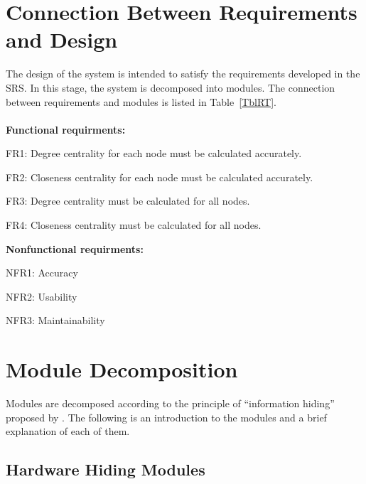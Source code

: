 \documentclass[12pt, titlepage]{article}
\begin{document}
\section{Connection Between Requirements and Design} \label{SecConnection}

The design of the system is intended to satisfy the requirements developed in
the SRS. In this stage, the system is decomposed into modules. The connection
between requirements and modules is listed in Table~\ref{TblRT}.\\\\
\textbf{Functional requirments:}
\begin{description}
\item FR1: Degree centrality for each node must be calculated accurately.
\item FR2: Closeness centrality for each node must be calculated accurately.
\item FR3: Degree centrality must be calculated for all nodes.
\item FR4: Closeness centrality must be calculated for all nodes.\\
\end{description}

\textbf{Nonfunctional requirments:}
\begin{description}
\item NFR1: Accuracy
\item NFR2: Usability
\item NFR3: Maintainability
\end{description}


\section{Module Decomposition} \label{SecMD}

Modules are decomposed according to the principle of ``information hiding''
proposed by \citet{ParnasEtAl1984}. 
The following is an introduction to the modules and a brief explanation of each of them.


\subsection{Hardware Hiding Modules }
\end{document}
